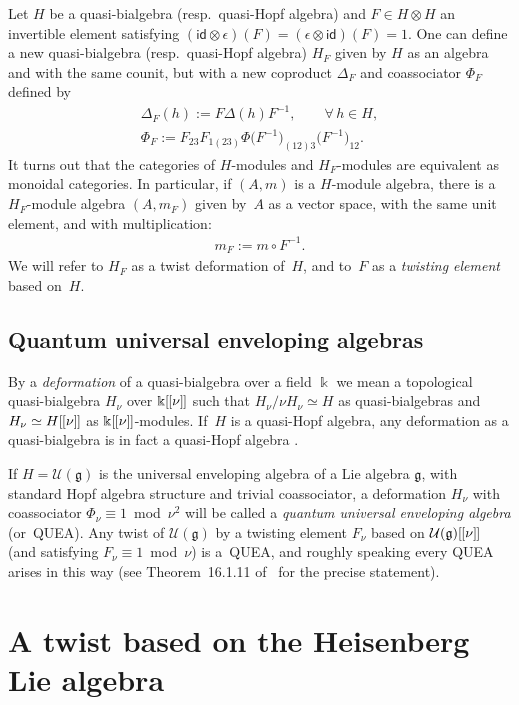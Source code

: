 \documentclass[10pt,a4paper]{amsart}
\numberwithin{equation}{section}
\theoremstyle{definition}
\newcommand{\U}{\mathcal{U}}
\newcommand{\id}{\mathsf{id}}
\newcommand{\mf}{\mathfrak}
\newcommand{\lbrak}{[\hspace{-0.5pt}[}
\newcommand{\rbrak}{]\hspace{-0.5pt}]}
\renewcommand{\hbar}{\nu}
\begin{document}
Let $H$ be a quasi-bialgebra (resp.~quasi-Hopf algebra) and $F\in H\otimes H$ an invertible element satisfying $(\id\otimes\epsilon)(F)=(\epsilon\otimes\id)(F)=1$. One can def\/ine a new quasi-bialgebra (resp.~quasi-Hopf algebra) $H_F$ given by $H$ as an algebra and with the same counit, but with a new coproduct $\Delta_F$ and coassociator $\Phi_F$ def\/ined by
\begin{gather*}
 \Delta_F(h) :=F\Delta(h)F^{-1},\qquad \forall\, h\in H,\\
 \Phi_F :=F_{23}F_{1(23)} \Phi
\big(F^{-1}\big)_{(12)3}\big(F^{-1}\big)_{12} .
\end{gather*}
It turns out that the categories of $H$-modules and $H_F$-modules are equivalent as monoidal categories.
In particular, if $(A,m)$ is a $H$-module algebra, there is a $H_F$-module algebra $(A,m_F)$ given by~$A$ as a vector space, with the same unit element, and with multiplication:
\begin{gather}\label{eq:mf}
m_F:=m\circ F^{-1} .
\end{gather}
We will refer to $H_F$ as a twist deformation of~$H$, and to~$F$ as a \emph{twisting element} based on~$H$.

\subsection{Quantum universal enveloping algebras}\label{sec:QUEA}

By a \emph{deformation} of a quasi-bialgebra over a f\/ield $\Bbbk$ we mean a topological quasi-bialgebra $H_\hbar$ over $\Bbbk\lbrak\hbar\rbrak$
such that $H_\hbar/\hbar H_\hbar\simeq H$ as quasi-bialgebras and $H_\hbar\simeq H\lbrak\hbar\rbrak$ as $\Bbbk\lbrak\hbar\rbrak$-modules.
If~$H$ is a quasi-Hopf algebra, any deformation as a quasi-bialgebra is in fact a quasi-Hopf algebra \cite[Section~16.1C]{CP94}.

If $H=\U(\mf{g})$ is the universal enveloping algebra of a Lie algebra $\mf{g}$, with standard Hopf algebra structure and trivial coassociator, a deformation $H_\hbar$ with coassociator \mbox{$\Phi_\hbar\equiv 1$ mod $\hbar^2$} will be called a \emph{quantum universal enveloping algebra} (or~QUEA). Any twist of $\U(\mf{g})$ by a twisting element $F_\hbar$ based on $\U(\mf{g})\lbrak\hbar\rbrak$
(and satisfying \mbox{$F_\hbar\equiv 1$ mod $\hbar$}) is a~QUEA, and roughly speaking every QUEA arises in this way (see Theorem~16.1.11 of~\cite{CP94} for the precise statement).

\section{A twist based on the Heisenberg Lie algebra}\label{sec:3}
\end{document}
